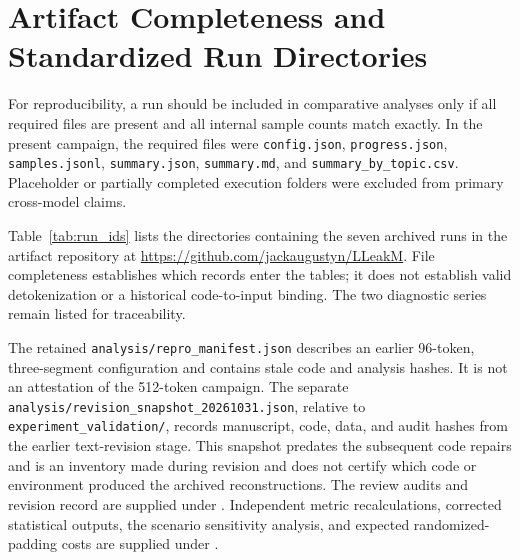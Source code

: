 \documentclass[electronics,article,submit,pdftex,moreauthors]{Definitions/mdpi}
\begin{document}
\appendixstart
\appendix
\section{Artifact Completeness and Standardized Run Directories}\label{app:runs}
For reproducibility, a run should be included in comparative analyses only if all required files are present and all internal sample counts match exactly. In the present campaign, the required files were \texttt{config.json}, \texttt{progress.json}, \texttt{samples.jsonl}, \texttt{summary.json}, \texttt{summary.md}, and \texttt{summary\_by\_topic.csv}. Placeholder or partially completed execution folders were excluded from primary cross-model claims.

Table~\ref{tab:run_ids} lists the directories containing the seven archived runs in the artifact repository at \url{https://github.com/jackaugustyn/LLeakM}. File completeness establishes which records enter the tables; it does not establish valid detokenization or a historical code-to-input binding. The two diagnostic series remain listed for traceability.

The retained \texttt{analysis/repro\_manifest.json} describes an earlier 96-token, three-segment configuration and contains stale code and analysis hashes. It is not an attestation of the 512-token campaign. The separate \texttt{analysis/revision\_snapshot\_20261031.json}, relative to \texttt{experiment\_validation/}, records manuscript, code, data, and audit hashes from the earlier text-revision stage. This snapshot predates the subsequent code repairs and is an inventory made during revision and does not certify which code or environment produced the archived reconstructions. The review audits and revision record are supplied under . Independent metric recalculations, corrected statistical outputs, the scenario sensitivity analysis, and expected randomized-padding costs are supplied under .
\end{document}
